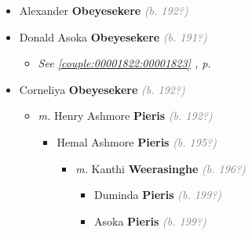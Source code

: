 \documentclass[10pt, openany]{book}
\begin{document}
\begin{itemize}
{\begin{itemize}
{\begin{itemize}
{\begin{itemize}
{  }
\item{Chrisanthi Pieris \textbf{Deraniyagala} \textcolor{gray}{\textit{(b. 194?)}}
  }
\item{Savithri Pieris \textbf{Deraniyagala} \textcolor{gray}{\textit{(b. 195?)}}
  }
\item{Surani Pieris \textbf{Deraniyagala} \textcolor{gray}{\textit{(b. 195?)}}
  }
\item{Ravindra Pieris \textbf{Deraniyagala} \textcolor{gray}{\textit{(b. 195?)}}
  }
\end{itemize}}
\end{itemize}
 }
\item{Alexander \textbf{Obeyesekere} \textcolor{gray}{\textit{(b. 192?)}}
 }
\item{Donald Asoka \textbf{Obeyesekere} \textcolor{gray}{\textit{(b. 191?)}}
\begin{itemize}
\item{\textcolor{slteal}{\textit{See  \autoref{couple:00001822:00001823} \textit{, p. \pageref{couple:00001822:00001823} }}}}
\end{itemize}
  }
\item{Corneliya \textbf{Obeyesekere} \textcolor{gray}{\textit{(b. 192?)}}
\begin{itemize}
\item{\textit{m.} Henry Ashmore \textbf{Pieris} \textcolor{gray}{\textit{(b. 192?)}}   \label{couple:00002046:00002047} \begin{itemize}
\item{Hemal Ashmore \textbf{Pieris} \textcolor{gray}{\textit{(b. 195?)}}
\begin{itemize}
\item{\textit{m.} Kanthi \textbf{Weerasinghe} \textcolor{gray}{\textit{(b. 196?)}}   \label{couple:00002056:00002057} \begin{itemize}
\item{Duminda \textbf{Pieris} \textcolor{gray}{\textit{(b. 199?)}}
 }
\item{Asoka \textbf{Pieris} \textcolor{gray}{\textit{(b. 199?)}}
 }
\end{itemize}}
\end{itemize}
}
\end{itemize}}
\end{itemize}}
\end{itemize}}
\end{itemize}
\end{document}
